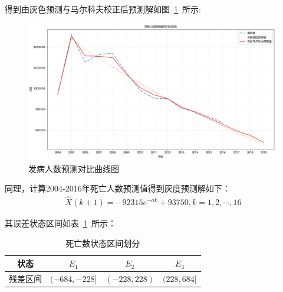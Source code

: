 \documentclass{whutmod}
\begin{document}
	  得到由灰色预测与马尔科夫校正后预测解如图~\ref{afd}~所示:
    \begin{figure}[H]
	\centering
	\includegraphics[width=\textwidth]{figures/f.png}
	\caption{发病人数预测对比曲线图}\label{afd}
\end{figure}


	  同理，计算2004-2016年死亡人数预测值得到灰度预测解如下：
	  \begin{gather}
	  	  \widehat{X}(k+1)=-92315e^{-ak}+93750,k=1,2,\cdots,16
	  \end{gather}

	  

	  其误差状态区间如表~\ref{ss}~所示：
	    \begin{table}[H]
	  	\centering\caption{死亡数状态区间划分}\label{ss}
	  	\begin{tabular}{cccc}
	  		\toprule[1.5pt]
	  		\multicolumn{1}{m{2cm}}{\centering 状态}
	  		& \multicolumn{1}{m{3cm}}{\centering $E_{1}$}
	  		& \multicolumn{1}{m{3cm}}{\centering $E_{2}$}
	  		& \multicolumn{1}{m{3cm}}{\centering $E_{3}$}
	  		\\
	  		\midrule[0.5pt]
	  		残差区间 &  $(-684,-228]$  &$(-228,228)$ & $(228,684]$   \\ 
	  		\bottomrule[1.5pt]	
	  	\end{tabular}
	  \end{table}
	  
\end{document}
